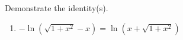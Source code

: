 Demonstrate the identity(s).

\begin{enumerate}[ref={\fcProblemRef}]
\item $-\ln \left(\sqrt{1+x^2}-x\right)= \ln\left(x+\sqrt{1+x^2}\right)$
\end{enumerate}